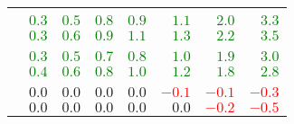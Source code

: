 \begin{table}[htpb]
\begin{tabular}{lrrrrrrr}
    & \multicolumn{7}{c}{\sla{}} \\ \cmidrule(lr){2-8}
    \uslpropGsecTwin{}          & \textcolor{Green}{$0.3$} & \textcolor{Green}{$0.5$} & \textcolor{Green}{$0.8$} & \textcolor{Green}{$0.9$} & \textcolor{Green}{$1.1$} & \textcolor{Green}{$2.0$} & \textcolor{Green}{$3.3$} \\
    \usruleTwin{}               & \textcolor{Green}{$0.3$} & \textcolor{Green}{$0.6$} & \textcolor{Green}{$0.9$} & \textcolor{Green}{$1.1$} & \textcolor{Green}{$1.3$} & \textcolor{Green}{$2.2$} & \textcolor{Green}{$3.5$} \\
    & \multicolumn{7}{c}{\epi{}} \\ \cmidrule(lr){2-8}
    \uslpropGsecTwin{}          & \textcolor{Green}{$0.3$} & \textcolor{Green}{$0.5$} & \textcolor{Green}{$0.7$} & \textcolor{Green}{$0.8$} & \textcolor{Green}{$1.0$} & \textcolor{Green}{$1.9$} & \textcolor{Green}{$3.0$} \\
    \usruleTwin{}               & \textcolor{Green}{$0.4$} & \textcolor{Green}{$0.6$} & \textcolor{Green}{$0.8$} & \textcolor{Green}{$1.0$} & \textcolor{Green}{$1.2$} & \textcolor{Green}{$1.8$} & \textcolor{Green}{$2.8$} \\
    & \multicolumn{7}{c}{\kiw{}} \\ \cmidrule(lr){2-8}
    \uslpropGsecTwin{}          & $0.0$                    & $0.0$                    & $0.0$                    & $0.0$                    & \textcolor{Red}{$-0.1$}  & \textcolor{Red}{$-0.1$}  & \textcolor{Red}{$-0.3$}  \\
    \usruleTwin{}               & $0.0$                    & $0.0$                    & $0.0$                    & $0.0$                    & $0.0$                    & \textcolor{Red}{$-0.2$}  & \textcolor{Red}{$-0.5$}  \\
    \bottomrule
  \end{tabular}
\end{table}
